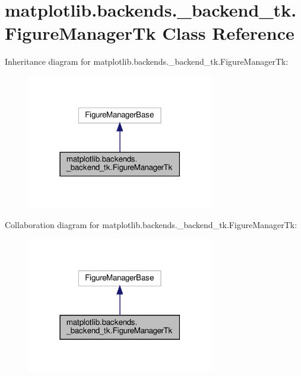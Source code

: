 \hypertarget{classmatplotlib_1_1backends_1_1__backend__tk_1_1FigureManagerTk}{}\section{matplotlib.\+backends.\+\_\+backend\+\_\+tk.\+Figure\+Manager\+Tk Class Reference}
\label{classmatplotlib_1_1backends_1_1__backend__tk_1_1FigureManagerTk}


Inheritance diagram for matplotlib.\+backends.\+\_\+backend\+\_\+tk.\+Figure\+Manager\+Tk\+:
\nopagebreak
\begin{figure}[H]
\begin{center}
\leavevmode
\includegraphics[width=231pt]{classmatplotlib_1_1backends_1_1__backend__tk_1_1FigureManagerTk__inherit__graph}
\end{center}
\end{figure}


Collaboration diagram for matplotlib.\+backends.\+\_\+backend\+\_\+tk.\+Figure\+Manager\+Tk\+:
\nopagebreak
\begin{figure}[H]
\begin{center}
\leavevmode
\includegraphics[width=231pt]{classmatplotlib_1_1backends_1_1__backend__tk_1_1FigureManagerTk__coll__graph}
\end{center}
\end{figure}
